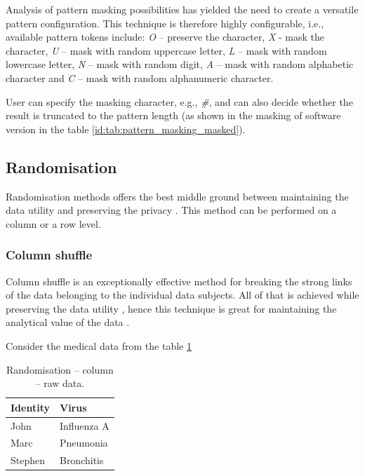 \documentclass[a4paper,twoside,12pt]{book}
\begin{document}
Analysis of pattern masking possibilities has yielded the need to create a versatile pattern configuration. This technique is therefore highly configurable, i.e., available pattern tokens include: \textit{O} – preserve the character, \textit{X} - mask the character, \textit{U} – mask with random uppercase letter, \textit{L} – mask with random lowercase letter, \textit{N} – mask with random digit, \textit{A} – mask with random alphabetic character and \textit{C} – mask with random alphanumeric character.

User can specify the masking character, e.g., \textit{\#}, and can also decide whether the result is truncated to the pattern length (as shown in the masking of software version in the table \ref{id:tab:pattern_masking_masked}).

\subsection{Randomisation}

Randomisation methods offers the best middle ground between maintaining the data utility and preserving the privacy \cite{bib:data_shuffling}. This method can be performed on a column or a row level.

\subsubsection{Column shuffle}

Column shuffle is an exceptionally effective method for breaking the strong links of the data belonging to the individual data subjects. All of that is achieved while preserving the data utility \cite{bib:gdpr_handbook}, hence this technique is great for maintaining the analytical value of the data \cite{bib:data_shuffling}.

Consider the medical data from the table \ref{id:tab:column_randomisation_raw}

\begin{table}[h]
\centering
\caption{Randomisation – column – raw data.}
\label{id:tab:column_randomisation_raw}
\begin{tabular}{ll}
\toprule
Identity & Virus \\ \midrule
John & Influenza A \\
Marc & Pneumonia \\
Stephen & Bronchitis \\ \bottomrule
\end{tabular}
\end{table}
\end{document}
